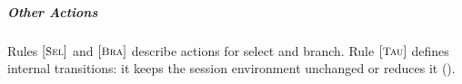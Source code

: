 \documentclass[a4paper,UKenglish]{lipics}
\theoremstyle{definition}
\begin{document}
\subparagraph{Other Actions}
Rules $\eltsrule{Sel}$ and $\eltsrule{Bra}$ describe actions for
select and branch.
Rule $\eltsrule{Tau}$ defines
internal transitions: 
it keeps the session environment unchanged or 
reduces it ().

\end{document}
